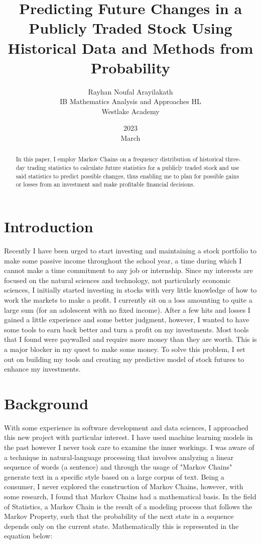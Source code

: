 \documentclass[12pt,final]{article}
\title{Predicting Future Changes in a Publicly Traded Stock Using Historical Data and Methods from Probability}
\author{Rayhan Noufal Arayilakath\\ IB Mathematics Analysis and Approaches HL\\ Westlake Academy}
\date{2023\\ March}
\begin{document}
\maketitle

\begin{abstract}
In this paper, I employ Markov Chains on a frequency distribution of historical three-day trading
statistics to calculate future statistics for a publicly traded stock and use said statistics to
predict possible changes, thus enabling me to plan for possible gains or losses from an investment 
and make profitable financial decisions.
\end{abstract}

\section{Introduction}
Recently I have been urged to start investing and maintaining a stock portfolio to make some
passive income throughout the school year, a time during which I cannot make a time commitment
to any job or internship. Since my interests are focused on the natural sciences and
technology, not particularly economic sciences, I initially started investing in stocks with
very little knowledge of how to work the markets to make a profit. I currently sit on a loss
amounting to quite a large sum (for an adolescent with no fixed income). After a few hits and
losses I gained a little experience and some better judgment, however, I wanted to have some
tools to earn back better and turn a profit on my investments. Most tools that I found were
paywalled and require more money than they are worth. This is a major blocker in my
quest to make some money. To solve this problem, I set out on building my tools and
creating my predictive model of stock futures to enhance my investments.

\section{Background}
With some experience in software development and data sciences, I approached this new project
with particular interest. I have used machine learning models in the past however I never took
care to examine the inner workings. I was aware of a technique in natural-language processing
that involves analyzing a linear sequence of words (a sentence) and through the usage of "Markov
Chains" generate text in a specific style based on a large corpus of text. Being a consumer, I
never explored the construction of Markov Chains, however, with some research, I found that Markov
Chains had a mathematical basis. In the field of Statistics, a Markov Chain is the
result of a modeling process that follows the Markov Property, such that the probability of the next
state in a sequence depends only on the current state. Mathematically this is represented in
the equation below:
\end{document}
